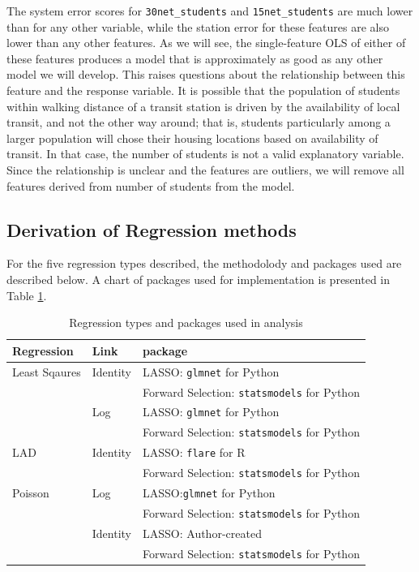 \documentclass[11pt]{article}
\begin{document}
The system error scores for \texttt{30net\_students} and \texttt{15net\_students} are much lower than for any other variable, while the station error for these features are also lower than any other features. As we will see, the single-feature OLS of either of these features produces a model that is approximately as good as any other model we will develop. This raises questions about the relationship between this feature and the response variable. It is possible that the population of students within walking distance of a transit station is driven by the availability of local transit, and not the other way around; that is, students particularly among a larger population will chose their housing locations based on availability of transit. In that case, the number of students is not a valid explanatory variable. Since the relationship is unclear and the features are outliers, we will remove all features derived from number of students from the model.



\subsection{Derivation of Regression methods}
For the five regression types described, the methodolody and packages used are described below. A chart of packages used for implementation is presented in Table \ref{tab:regtype}.

\begin{table} [H]
\centering
\begin{tabular}{lll}
\toprule Regression&Link&package\\
\midrule Least Sqaures&Identity&LASSO: \texttt{glmnet} for Python\\
&&Forward Selection: \texttt{statsmodels} for Python\\
&Log&LASSO: \texttt{glmnet} for Python\\
&&Forward Selection: \texttt{statsmodels} for Python\\
LAD&Identity&LASSO: \texttt{flare} for R\\
&&Forward Selection: \texttt{statsmodels} for Python\\
Poisson&Log&LASSO:\texttt{glmnet} for Python\\
&&Forward Selection: \texttt{statsmodels} for Python\\
&Identity&LASSO: Author-created\\
&&Forward Selection: \texttt{statsmodels} for Python\\
\bottomrule
\end{tabular}
\caption{Regression types and packages used in analysis}
\label{tab:regtype}
\end{table}
\end{document}
